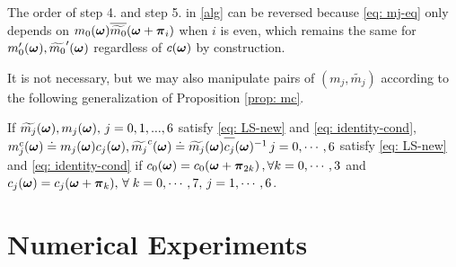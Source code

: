 The order of step 4. and step 5. in \ref{alg} can be reversed because \eqref{eq: mj-eq} only depends on $m_0(\boldsymbol{\omega})\overline{\widetilde{m_0}}(\boldsymbol{\omega} + \boldsymbol{\pi}_i)$ when $i$ is even, which remains the same for $m_0'(\boldsymbol{\omega}),\widetilde{m_0}'(\boldsymbol{\omega})$ regardless of $c(\boldsymbol{\omega})$ by construction.

It is not necessary, but we may also manipulate pairs of $(m_j,\widetilde{m_j})$ according to the following generalization of Proposition \ref{prop: mc}.
\begin{proposition}\label{prop: mjc}
If $\widetilde{m_{j}}(\boldsymbol{\omega}), m_j(\boldsymbol{\omega}),\,  j = 0,1,...,6$ satisfy \eqref{eq: LS-new} and \eqref{eq: identity-cond}, 
$m_j^c(\V{\omega})\doteq m_j(\V{\omega})c_j(\V{\omega}), \widetilde{m_j}^c(\V{\omega})\doteq \m{j}\overlinespace{c_j}(\V{\omega})^{-1} \, j = 0,\cdots,6$ 
satisfy \eqref{eq: LS-new} and \eqref{eq: identity-cond} if $ c_0(\boldsymbol{\omega}) = c_0(\boldsymbol{\omega}+\boldsymbol{\pi}_{2k})\,,\forall k = 0,\cdots,3$ and $c_j(\boldsymbol{\omega}) = c_j(\boldsymbol{\omega} + \boldsymbol{\pi}_k),\, \forall \;k = 0,\cdots,7,\, j = 1,\cdots,6$.
\end{proposition}

\begin{comment}
\subsection{solving $m_i$}
In the final step, we substitute $\mc{0}$ and $m_0^C(\V{\omega})$ into \eqref{eq: LS-new} and rewrite it into the following linear system,
\begin{align}\label{eq: mi}
\overline{\M}[:,2:7]\,\mathbf{m}[2:7](\V{\omega}) = 
\begin{bmatrix}
1-m_0^C\overline{\widetilde{m_0}^C}(\V{\omega})\\
0\\
-m_0^C\overline{\widetilde{m_0}^C}(\V{\omega}+\V{\pi}_2)\\
\vdots \\
0
\end{bmatrix}
=:\mathbf{b}(\V{\omega}).
\end{align}
The solution of \eqref{eq: mi} depends only on $m_0^C\overline{\widetilde{m_0}^C}$, or equivalently $m_0\overline{\widetilde{m_0}}$. 
\end{comment}

\section{Numerical Experiments}

